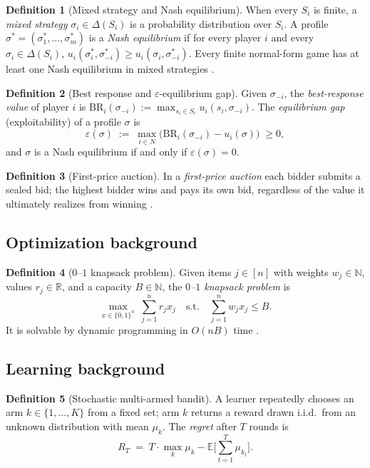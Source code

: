 \documentclass{article}
\theoremstyle{definition}
\newtheorem{definition}{Definition}
\theoremstyle{remark}
\newcommand{\N}{\mathbb{N}}
\newcommand{\R}{\mathbb{R}}
\newcommand{\E}{\mathbb{E}}
\newcommand{\BR}{\mathrm{BR}}
\begin{document}
\begin{definition}[Mixed strategy and Nash equilibrium]
When every $S_i$ is finite, a \emph{mixed strategy} $\sigma_i\in\Delta(S_i)$ is a probability distribution over $S_i$. A profile $\sigma^\ast=(\sigma_1^\ast,\dots,\sigma_m^\ast)$ is a \emph{Nash equilibrium} if for every player $i$ and every $\sigma_i\in\Delta(S_i)$,
$u_i(\sigma_i^\ast,\sigma_{-i}^\ast)\ge u_i(\sigma_i,\sigma_{-i}^\ast)$.
Every finite normal-form game has at least one Nash equilibrium in mixed strategies \citep{nash1951noncooperative}.
\end{definition}

\begin{definition}[Best response and $\varepsilon$-equilibrium gap]
Given $\sigma_{-i}$, the \emph{best-response value} of player $i$ is $\BR_i(\sigma_{-i}):=\max_{s_i\in S_i}u_i(s_i,\sigma_{-i})$. The \emph{equilibrium gap} (exploitability) of a profile $\sigma$ is
\[
\varepsilon(\sigma)\;:=\;\max_{i\in N}\Big(\BR_i(\sigma_{-i})-u_i(\sigma)\Big)\;\ge 0,
\]
and $\sigma$ is a Nash equilibrium if and only if $\varepsilon(\sigma)=0$.
\end{definition}

\begin{definition}[First-price auction]
In a \emph{first-price auction} each bidder submits a sealed bid; the highest bidder wins and pays its own bid, regardless of the value it ultimately realizes from winning \citep{krishna2009auction}.
\end{definition}

\subsection{Optimization background}

\begin{definition}[$0$--$1$ knapsack problem]
Given items $j\in[n]$ with weights $w_j\in\N$, values $r_j\in\R$, and a capacity $B\in\N$, the \emph{$0$--$1$ knapsack problem} is
\[
\max_{x\in\{0,1\}^n}\ \sum_{j=1}^n r_j x_j\quad\text{s.t.}\quad \sum_{j=1}^n w_j x_j\le B.
\]
It is solvable by dynamic programming in $O(nB)$ time \citep{kellerer2004knapsack}.
\end{definition}

\subsection{Learning background}

\begin{definition}[Stochastic multi-armed bandit]
A learner repeatedly chooses an arm $k\in\{1,\dots,K\}$ from a fixed set; arm $k$ returns a reward drawn i.i.d.\ from an unknown distribution with mean $\mu_k$. The \emph{regret} after $T$ rounds is
\[
R_T \;=\; T\cdot\max_k\mu_k-\E\Big[\sum_{t=1}^T\mu_{k_t}\Big].
\]
\end{definition}
\end{document}
